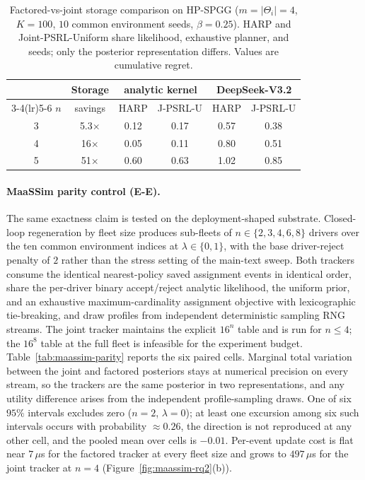 \begin{table}[t]
\centering\small
\caption{Factored-vs-joint storage comparison on HP-SPGG ($m{=}|\Theta_i|{=}4$, $K{=}100$, $10$ common environment seeds, $\beta{=}0.25$). HARP and Joint-PSRL-Uniform share likelihood, exhaustive planner, and seeds; only the posterior representation differs. Values are cumulative regret.}
\label{tab:storage-comparison}
\setlength{\tabcolsep}{4pt}
\begin{tabular}{@{}cccccc@{}}
\toprule
   & Storage & \multicolumn{2}{c}{analytic kernel} & \multicolumn{2}{c}{DeepSeek-V3.2} \\
\cmidrule(lr){3-4}\cmidrule(lr){5-6}
$n$ & savings & HARP & J-PSRL-U & HARP & J-PSRL-U \\
\midrule
3 & 5.3$\times$ & 0.12 & 0.17 & 0.57 & 0.38 \\
4 & 16$\times$  & 0.05 & 0.11 & 0.80 & 0.51 \\
5 & 51$\times$  & 0.60 & 0.63 & 1.02 & 0.85 \\
\bottomrule
\end{tabular}
\end{table}
\paragraph{MaaSSim parity control (E-E).}
The same exactness claim is tested on the deployment-shaped substrate. Closed-loop regeneration by fleet size produces sub-fleets of $n\in\{2,3,4,6,8\}$ drivers over the ten common environment indices at $\lambda\in\{0,1\}$, with the base driver-reject penalty of $2$ rather than the stress setting of the main-text sweep. Both trackers consume the identical nearest-policy saved assignment events in identical order, share the per-driver binary accept/reject analytic likelihood, the uniform prior, and an exhaustive maximum-cardinality assignment objective with lexicographic tie-breaking, and draw profiles from independent deterministic sampling RNG streams. The joint tracker maintains the explicit $16^{n}$ table and is run for $n\le4$; the $16^{8}$ table at the full fleet is infeasible for the experiment budget. Table~\ref{tab:maassim-parity} reports the six paired cells. Marginal total variation between the joint and factored posteriors stays at numerical precision on every stream, so the trackers are the same posterior in two representations, and any utility difference arises from the independent profile-sampling draws. One of six $95\%$ intervals excludes zero ($n{=}2$, $\lambda{=}0$); at least one excursion among six such intervals occurs with probability ${\approx}0.26$, the direction is not reproduced at any other cell, and the pooled mean over cells is $-0.01$. Per-event update cost is flat near $7\,\mu$s for the factored tracker at every fleet size and grows to $497\,\mu$s for the joint tracker at $n{=}4$ (Figure~\ref{fig:maassim-rq2}(b)).

